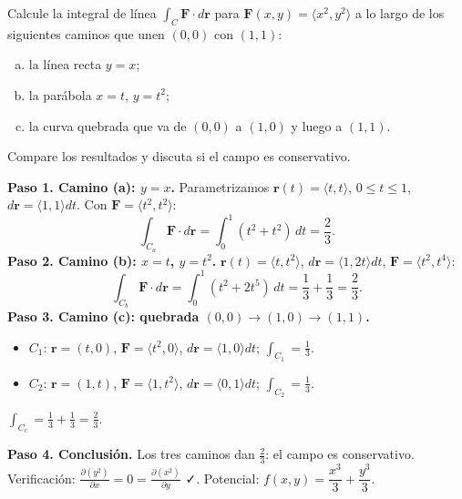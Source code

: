 \begin{prob}
Calcule la integral de línea $\int_C \mathbf{F}\cdot d\mathbf{r}$ para
$\mathbf{F}(x,y)=\langle x^2, y^2 \rangle$ a lo largo de los siguientes
caminos que unen $(0,0)$ con $(1,1)$:
\begin{enumerate}[(a)]
    \item la línea recta $y=x$;
    \item la parábola $x=t$, $y=t^2$;
    \item la curva quebrada que va de $(0,0)$ a $(1,0)$ y luego a $(1,1)$.
\end{enumerate}
Compare los resultados y discuta si el campo es conservativo.
\begin{myproof}
\textbf{Paso 1. Camino (a): $y=x$.} Parametrizamos $\mathbf{r}(t)=\langle t,t\rangle$, $0\le t\le1$, $d\mathbf{r}=\langle1,1\rangle dt$. Con $\mathbf{F}=\langle t^2,t^2\rangle$:
\[
\int_{C_a}\mathbf{F}\cdot d\mathbf{r}=\int_0^1(t^2+t^2)\,dt=\frac{2}{3}.
\]
\textbf{Paso 2. Camino (b): $x=t$, $y=t^2$.} $\mathbf{r}(t)=\langle t,t^2\rangle$, $d\mathbf{r}=\langle1,2t\rangle dt$, $\mathbf{F}=\langle t^2,t^4\rangle$:
\[
\int_{C_b}\mathbf{F}\cdot d\mathbf{r}=\int_0^1(t^2+2t^5)\,dt=\frac{1}{3}+\frac{1}{3}=\frac{2}{3}.
\]
\textbf{Paso 3. Camino (c): quebrada $(0,0)\to(1,0)\to(1,1)$.}
\begin{itemize}
\item $C_1$: $\mathbf{r}=(t,0)$, $\mathbf{F}=\langle t^2,0\rangle$, $d\mathbf{r}=\langle1,0\rangle dt$;\; $\int_{C_1}=\tfrac{1}{3}$.
\item $C_2$: $\mathbf{r}=(1,t)$, $\mathbf{F}=\langle1,t^2\rangle$, $d\mathbf{r}=\langle0,1\rangle dt$;\; $\int_{C_2}=\tfrac{1}{3}$.
\end{itemize}
$\displaystyle\int_{C_c}=\frac13+\frac13=\frac{2}{3}.$

\textbf{Paso 4. Conclusión.} Los tres caminos dan $\frac23$: el campo es conservativo. Verificación: $\tfrac{\partial(y^2)}{\partial x}=0=\tfrac{\partial(x^2)}{\partial y}$ ✓. Potencial: $f(x,y)=\dfrac{x^3}{3}+\dfrac{y^3}{3}$.
\end{myproof}
\end{prob}

